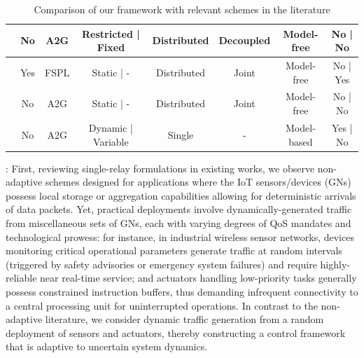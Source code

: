 \documentclass[12pt, draftcls, onecolumn]{IEEEtran}
\theoremstyle{plain}
\theoremstyle{definition}
\theoremstyle{remark}
\begin{document}
\begin{table}
\begin{center}
\begin{tabular}{| c | c | c | c | c | c | c | c |}
    \hline
    \cite{RLSenseSend} & No & A2G & Restricted | Fixed & Distributed & Decoupled & Model-free & No | No\\
    \hline
    \cite{DQNPositioning} & Yes & FSPL & Static | - & Distributed & Joint & Model-free & No | Yes\\
    \hline
    \cite{MLDeployment} & No & A2G & Static | - & Distributed & Joint & Model-free & No | No\\
    \hline
    \cite{Rician} & No & A2G & Dynamic | Variable & Single & - & Model-based & Yes | No\\
    \hline
    \end{tabular}
\caption{Comparison of our framework with relevant schemes in the literature}\label{T1}
\vspace{-14mm}
\end{center}
\end{table}

: First, reviewing single-relay formulations in existing works, we observe non-adaptive schemes \cite{SCA, PAoI, MEC-CVX, LoSMap, Rician} designed for applications where the IoT sensors/devices (GNs) possess local storage or aggregation capabilities allowing for deterministic arrivals of data packets. Yet, practical deployments involve dynamically-generated traffic from miscellaneous sets of GNs, each with varying degrees of QoS mandates and technological prowess: for instance, in industrial wireless sensor networks, devices monitoring critical operational parameters generate traffic at random intervals (triggered by safety advisories or emergency system failures) and require highly-reliable near real-time service; and actuators handling low-priority tasks generally possess constrained instruction buffers, thus demanding infrequent connectivity to a central processing unit for uninterrupted operations. In contrast to the non-adaptive literature, we consider dynamic traffic generation from a random deployment of sensors and actuators, thereby constructing a control framework that is adaptive to uncertain system dynamics.
\end{document}
